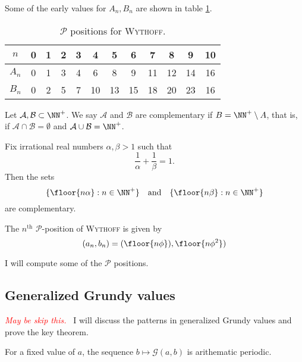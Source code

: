\documentclass[11pt,twoside]{scrartcl}
\newcommand{\mcA}{\mathcal{A}}
\newcommand{\mcB}{\mathcal{B}}
\newcommand{\msP}{\mathscr{P}}
\newcommand{\TODO}[1]{\emph{\textcolor{red}{#1\ }}}
\begin{document}
Some of the early values for $A_n, B_n$ are shown in table \ref{tab:wyth-p}.

\begin{table}[h]
    \centering
    \begin{tabular}{c|*{11}c}
    $n$    & 0 & 1 & 2 & 3 & 4  & 5  & 6  & 7  & 8  & 9  & 10  \\ \hline
    $A_n$ & 0 & 1 & 3 & 4 & 6  & 8  & 9  & 11 & 12 & 14 & 16  \\
    $B_n$ & 0 & 2 & 5 & 7 & 10 & 13 & 15 & 18 & 20 & 23 & 16 
    \end{tabular}
    \caption{\label{tab:wyth-p}$\msP$ positions for \textsc{Wythoff}.}

    \end{table}

\begin{definition}
    Let $\mcA, \mcB \subset \NN^+$. We say $\mcA$ and $\mcB$ are complementary if $B = \NN^+ \setminus A$, that is, if $\mcA \cap \mcB = \emptyset$ and $\mcA \cup \mcB = \NN^+$.
\end{definition}

\begin{lemma}\label{lemma-wyth-comp}
    Fix irrational real numbers $\alpha, \beta > 1$ such that
    \[\frac{1}{\alpha} + \frac{1}{\beta} = 1.\]
    Then the sets 
        \[\{\floor{n\alpha}: n \in \NN^+\} \quad\text{and}\quad \{\floor{n\beta}: n \in \NN^+\}\]
        are complementary.
\end{lemma}
\begin{theorem}\label{thm-wyth}
    The $n^{\text{th}}$ $\mathscr{P}$-position of \textsc{Wythoff} is given by
    \[(a_n,b_n) = (\floor{n\phi}), \floor{n\phi^2})\] 
\end{theorem}

I will compute some of the $\mathscr{P}$ positions.

\subsection{Generalized Grundy values}
\TODO{May be skip this.}
I will discuss the patterns in generalized Grundy values and prove the key theorem.
\begin{theorem}
    For a fixed value of $a$, the sequence $b \mapsto \mathscr{G}(a,b)$ is arithematic periodic.
\end{theorem}
\end{document}
